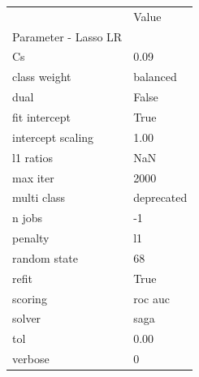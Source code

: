 \begin{tabular}{ll}
\toprule
 & Value \\
Parameter - Lasso LR &  \\
\midrule
Cs & 0.09 \\
class weight & balanced \\
dual & False \\
fit intercept & True \\
intercept scaling & 1.00 \\
l1 ratios & NaN \\
max iter & 2000 \\
multi class & deprecated \\
n jobs & -1 \\
penalty & l1 \\
random state & 68 \\
refit & True \\
scoring & roc auc \\
solver & saga \\
tol & 0.00 \\
verbose & 0 \\
\bottomrule
\end{tabular}
